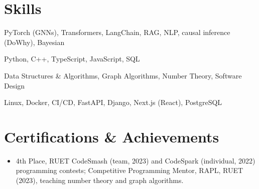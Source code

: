 \documentclass[10pt, a4paper]{article}
\newcommand{\resitem}[1]{\item #1} %
\begin{document}
\section{Skills}
\begin{description}[style=unboxed, leftmargin=0pt, itemsep=0.2ex]
    \item[AI/ML:] PyTorch (GNNs), Transformers, LangChain, RAG, NLP, causal inference (DoWhy), Bayesian
    \item[Languages:] Python, C++, TypeScript, JavaScript, SQL
    \item[CS Fundamentals:] Data Structures \& Algorithms, Graph Algorithms, Number Theory, Software Design
    \item[Systems \& Tools:] Linux, Docker, CI/CD, FastAPI, Django, Next.js (React), PostgreSQL
\end{description}

\section{Certifications \& Achievements}
\begin{itemize}
    \resitem{4th Place, RUET CodeSmash (team, 2023) \href{https://drive.google.com/file/d/1ESOpq2KagzqafmpEjau5RvhTNeop4FKN/view?usp=sharing}{\faExternalLink*} and CodeSpark (individual, 2022) \href{https://drive.google.com/file/d/18CvmRA4xr3TkCpSjNxsQMxBSmh_yQUQz/view?usp=sharing}{\faExternalLink*} programming contests; Competitive Programming Mentor, RAPL, RUET (2023), teaching number theory and graph algorithms.}
\end{itemize}

\end{document}
